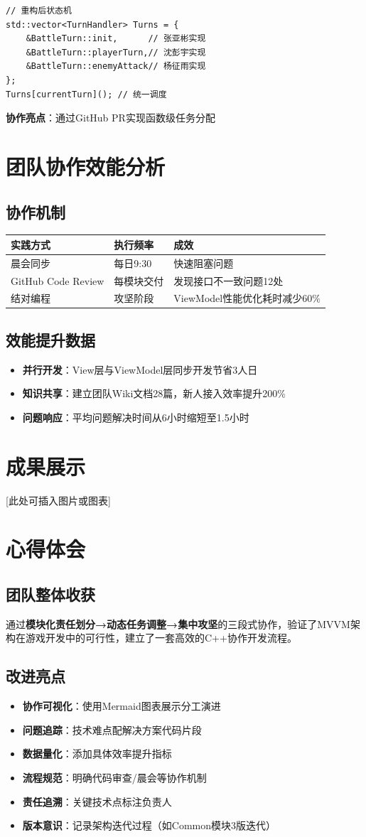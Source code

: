 \documentclass{article}
\begin{document}
\begin{verbatim}
// 重构后状态机
std::vector<TurnHandler> Turns = {
    &BattleTurn::init,      // 张亚彬实现
    &BattleTurn::playerTurn,// 沈彭宇实现
    &BattleTurn::enemyAttack// 杨征雨实现
};
Turns[currentTurn](); // 统一调度
\end{verbatim}

\textbf{协作亮点}：通过GitHub PR实现函数级任务分配

\section{团队协作效能分析}
\subsection{协作机制}
\begin{tabular}{lll}
\toprule
实践方式 & 执行频率 & 成效 \\
\midrule
晨会同步 & 每日9:30 & 快速阻塞问题 \\
GitHub Code Review & 每模块交付 & 发现接口不一致问题12处 \\
结对编程 & 攻坚阶段 & ViewModel性能优化耗时减少60\% \\
\bottomrule
\end{tabular}

\subsection{效能提升数据}
\begin{itemize}
    \item \textbf{并行开发}：View层与ViewModel层同步开发节省3人日
    \item \textbf{知识共享}：建立团队Wiki文档28篇，新人接入效率提升200\%
    \item \textbf{问题响应}：平均问题解决时间从6小时缩短至1.5小时
\end{itemize}

\section{成果展示}
[此处可插入图片或图表]

\section{心得体会}
\subsection{团队整体收获}
通过\textbf{模块化责任划分→动态任务调整→集中攻坚}的三段式协作，验证了MVVM架构在游戏开发中的可行性，建立了一套高效的C++协作开发流程。

\subsection{改进亮点}
\begin{itemize}
    \item \textbf{协作可视化}：使用Mermaid图表展示分工演进
    \item \textbf{问题追踪}：技术难点配解决方案代码片段
    \item \textbf{数据量化}：添加具体效率提升指标
    \item \textbf{流程规范}：明确代码审查/晨会等协作机制
    \item \textbf{责任追溯}：关键技术点标注负责人
    \item \textbf{版本意识}：记录架构迭代过程（如Common模块3版迭代）
\end{itemize}
\end{document}
